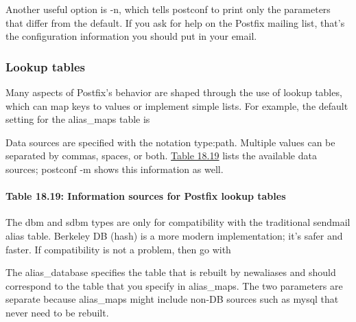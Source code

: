 Another useful option is {-n}, which tells {postconf} to print only the
parameters that differ from the default. If you ask for help on the
Postfix mailing list, that's the configuration information you should
put in your email.

\subsubsection[Lookup
tables]{\texorpdfstring{\protect\hypertarget{part0026_split_061.htmlux5cux23_idTextAnchor1177}{}{}Lookup
tables}{Lookup tables}}

\protect\hypertarget{part0026_split_061.htmlux5cux23_idIndexMarker2712}{}{}Many
aspects of Postfix's behavior are shaped through the use of lookup
tables, which can map keys to values or implement simple lists. For
example, the default setting for the {alias\_maps} table is


Data sources are specified with the notation {type:path}. Multiple
values can be separated by commas, spaces, or both.
\protect\hyperlink{part0026_split_061.htmlux5cux23_idTextAnchor1178}{Table
18.19} lists the available data sources; {postconf -m} shows this
information as well.

\paragraph[{Table 18.19: }Information sources for Postfix lookup
tables]{\texorpdfstring{{Table 18.19:
}\protect\hypertarget{part0026_split_061.htmlux5cux23_idTextAnchor1178}{}{}\protect\hypertarget{part0026_split_061.htmlux5cux23_idTextAnchor1179}{}{}Information
sources for Postfix lookup
tables}{Table 18.19: Information sources for Postfix lookup tables}}


The {dbm} and {sdbm} types are only for compatibility with the
traditional {sendmail} alias table. Berkeley DB ({hash}) is a more
modern implementation; it's safer and faster. If compatibility is not a
problem, then go
with\protect\hypertarget{part0026_split_061.htmlux5cux23_idIndexMarker2713}{}{}\protect\hypertarget{part0026_split_061.htmlux5cux23_idIndexMarker2714}{}{}


The {alias\_database} specifies the table that is rebuilt by
\protect\hypertarget{part0026_split_061.htmlux5cux23_idIndexMarker2715}{}{}{newaliases}
and should correspond to the table that you specify in {alias\_maps}.
The two parameters are separate because {alias\_maps} might include
non-DB sources such as {mysql} that never need to be rebuilt.


